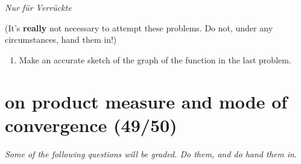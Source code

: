 \documentclass[lang=cn,11pt]{elegantbook}
\begin{document}
\begin{center}
  \textit{Nur f\"ur Verr\"uckte}
\end{center}
(It's \textbf{really} not necessary to attempt these problems. Do not, under any circumstances, hand them in!) 

\begin{enumerate}
    \item Make an accurate sketch of the graph of the function in the last problem.
\end{enumerate}






\chapter{on product measure and mode of convergence (49/50)}
\begin{center}
\textit{Some of the following questions will be graded. Do them, and do hand them in}.
\end{center}
\end{document}
